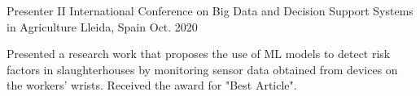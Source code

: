 

\begin{cventries}

  \cventry
    {Presenter} %
      {II International Conference on Big Data and Decision Support Systems in Agriculture} %
    {Lleida, Spain} %
    {Oct. 2020} %
    {
      \begin{cvitems} %
        \item {Presented a research work that proposes the use of ML models to detect risk factors in slaughterhouses by monitoring sensor data obtained from devices on the workers' wrists. Received the award for "Best Article".}
      \end{cvitems}
    }

\end{cventries}
